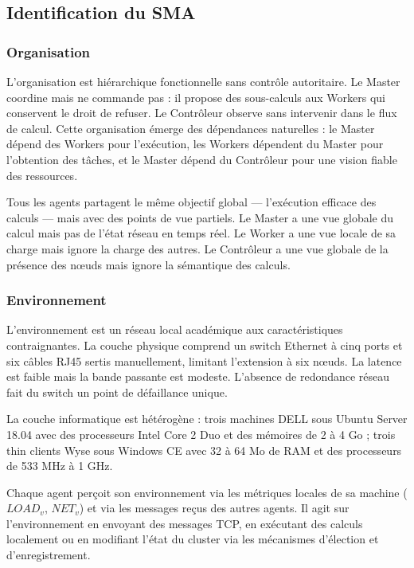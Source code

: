 \documentclass[12pt,a4paper]{report}
\begin{document}
\subsection{Identification du SMA}

\subsubsection{Organisation}

L'organisation est hiérarchique fonctionnelle sans contrôle autoritaire. Le Master coordine mais ne commande pas : il propose des sous-calculs aux Workers qui conservent le droit de refuser. Le Contrôleur observe sans intervenir dans le flux de calcul. Cette organisation émerge des dépendances naturelles : le Master dépend des Workers pour l'exécution, les Workers dépendent du Master pour l'obtention des tâches, et le Master dépend du Contrôleur pour une vision fiable des ressources.

Tous les agents partagent le même objectif global — l'exécution efficace des calculs — mais avec des points de vue partiels. Le Master a une vue globale du calcul mais pas de l'état réseau en temps réel. Le Worker a une vue locale de sa charge mais ignore la charge des autres. Le Contrôleur a une vue globale de la présence des nœuds mais ignore la sémantique des calculs.

\subsubsection{Environnement}

L'environnement est un réseau local académique aux caractéristiques contraignantes. La couche physique comprend un switch Ethernet à cinq ports et six câbles RJ45 sertis manuellement, limitant l'extension à six nœuds. La latence est faible mais la bande passante est modeste. L'absence de redondance réseau fait du switch un point de défaillance unique.

La couche informatique est hétérogène : trois machines DELL sous Ubuntu Server 18.04 avec des processeurs Intel Core 2 Duo et des mémoires de 2 à 4 Go ; trois thin clients Wyse sous Windows CE avec 32 à 64 Mo de RAM et des processeurs de 533 MHz à 1 GHz.

Chaque agent perçoit son environnement via les métriques locales de sa machine ($LOAD_v$, $NET_v$) et via les messages reçus des autres agents. Il agit sur l'environnement en envoyant des messages TCP, en exécutant des calculs localement ou en modifiant l'état du cluster via les mécanismes d'élection et d'enregistrement.
\end{document}
